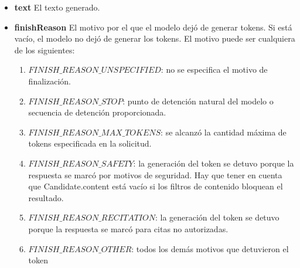 \begin{itemize}
	\item \textbf{text}	El texto generado.
	\item \textbf{finishReason}	El motivo por el que el modelo dejó de generar tokens. Si está vacío, el modelo no dejó de generar los tokens. El motivo puede ser cualquiera de los siguientes:
	\begin{enumerate}
		\item $FINISH\_REASON\_UNSPECIFIED$: no se especifica el motivo de finalización.
		\item $FINISH\_REASON\_STOP$: punto de detención natural del modelo o secuencia de detención proporcionada.
		\item $FINISH\_REASON\_MAX\_TOKENS$: se alcanzó la cantidad máxima de tokens especificada en la solicitud.
		\item $FINISH\_REASON\_SAFETY$: la generación del token se detuvo porque la respuesta se marcó por motivos de seguridad. Hay que tener en cuenta que Candidate.content está vacío si los filtros de contenido bloquean el resultado.
		\item $FINISH\_REASON\_RECITATION$: la generación del token se detuvo porque la respuesta se marcó para citas no autorizadas.
		\item $FINISH\_REASON\_OTHER$: todos los demás motivos que detuvieron el token
	\end{enumerate}
	

\end{itemize}
